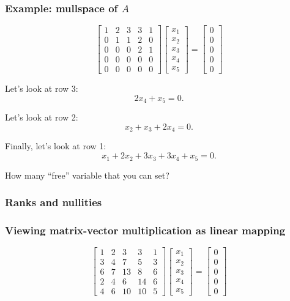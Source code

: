 \begin{frame}
  \frametitle{Example: mullspace of $A$}

  {\footnotesize
    \[
    \begin{bmatrix}
      1 & 2 & 3 & 3 & 1 \\
      0 & 1 & 1 & 2 & 0 \\
      0 & 0 & 0 & 2 & 1 \\
      0 & 0 & 0 & 0 & 0 \\
      0 & 0 & 0 & 0 & 0 
    \end{bmatrix}
    \begin{bmatrix}
      x_1 \\ x_2 \\ x_3 \\ x_4 \\ x_5
    \end{bmatrix}
    =
    \begin{bmatrix}
      0 \\ 0 \\ 0 \\ 0 \\ 0
    \end{bmatrix}
    \]
  }
  \vspace{0.2in}
  
  \pause
  Let's look at row 3:
  \[
  2x_4 + x_5 = 0.
  \]

  \pause
  Let's look at row 2:
  \[
  x_2 + x_3 + 2x_4 = 0.
  \]

  \pause
  Finally, let's look at row 1:
  \[
  x_1 + 2x_2 + 3x_3 + 3x_4 + x_5 = 0.
  \]

  \pause
  How many ``free'' variable that you can set?
  
\end{frame}

\begin{frame}
  \frametitle{Ranks and nullities}
\end{frame}

\begin{frame}
  \frametitle{Viewing matrix-vector multiplication as linear mapping}
  {\footnotesize
    \[
    \begin{bmatrix}
    1 & 2 & 3 & 3 & 1 \\
    3 & 4 & 7 & 5 & 3 \\
    6 & 7 & 13 & 8 & 6 \\
    2 & 4 & 6 & 14 & 6 \\
    4 & 6 & 10 & 10 & 5 
    \end{bmatrix}
    \begin{bmatrix}
      x_1 \\ x_2 \\ x_3 \\ x_4 \\ x_5
    \end{bmatrix}
    =
    \begin{bmatrix}
      0 \\ 0 \\ 0 \\ 0 \\ 0
    \end{bmatrix}
    \]
  }
  \vspace{2in}
\end{frame}

